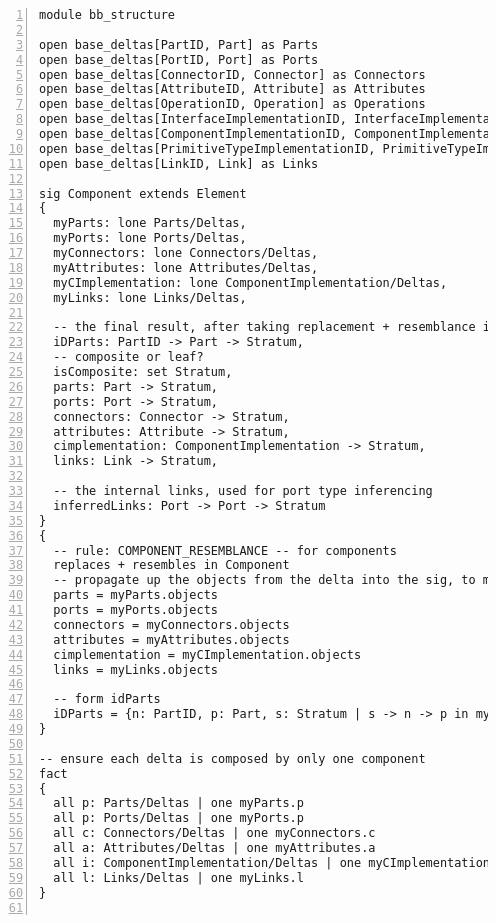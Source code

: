\lstset{frame=tb, aboveskip=12pt, belowskip=-3pt, breaklines=true, tabsize=2, mathescape=true}
\begin{lstlisting}[caption={bb\_structure.als}, numbers=left]
module bb_structure

open base_deltas[PartID, Part] as Parts
open base_deltas[PortID, Port] as Ports
open base_deltas[ConnectorID, Connector] as Connectors
open base_deltas[AttributeID, Attribute] as Attributes
open base_deltas[OperationID, Operation] as Operations
open base_deltas[InterfaceImplementationID, InterfaceImplementation] as InterfaceImplementation
open base_deltas[ComponentImplementationID, ComponentImplementation] as ComponentImplementation
open base_deltas[PrimitiveTypeImplementationID, PrimitiveTypeImplementation] as PrimitiveTypeImplementation
open base_deltas[LinkID, Link] as Links

sig Component extends Element
{
  myParts: lone Parts/Deltas,
  myPorts: lone Ports/Deltas,
  myConnectors: lone Connectors/Deltas,
  myAttributes: lone Attributes/Deltas,
  myCImplementation: lone ComponentImplementation/Deltas,
  myLinks: lone Links/Deltas,
  
  -- the final result, after taking replacement + resemblance into account
  iDParts: PartID -> Part -> Stratum,
  -- composite or leaf?
  isComposite: set Stratum,
  parts: Part -> Stratum,
  ports: Port -> Stratum,
  connectors: Connector -> Stratum,
  attributes: Attribute -> Stratum,
  cimplementation: ComponentImplementation -> Stratum,
  links: Link -> Stratum,
  
  -- the internal links, used for port type inferencing
  inferredLinks: Port -> Port -> Stratum
}
{
  -- rule: COMPONENT_RESEMBLANCE -- for components
  replaces + resembles in Component
  -- propagate up the objects from the delta into the sig, to make it more convenient
  parts = myParts.objects
  ports = myPorts.objects
  connectors = myConnectors.objects
  attributes = myAttributes.objects
  cimplementation = myCImplementation.objects
  links = myLinks.objects

  -- form idParts
  iDParts = {n: PartID, p: Part, s: Stratum | s -> n -> p in myParts.objects_e}
}

-- ensure each delta is composed by only one component
fact
{
  all p: Parts/Deltas | one myParts.p
  all p: Ports/Deltas | one myPorts.p
  all c: Connectors/Deltas | one myConnectors.c
  all a: Attributes/Deltas | one myAttributes.a
  all i: ComponentImplementation/Deltas | one myCImplementation.i
  all l: Links/Deltas | one myLinks.l
}


\end{lstlisting}
